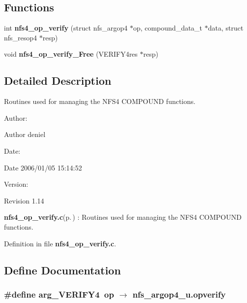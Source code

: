 \subsection*{Functions}
\begin{CompactItemize}
\item 
int {\bf nfs4\_\-op\_\-verify} (struct nfs\_\-argop4 $\ast$op, compound\_\-data\_\-t $\ast$data, struct nfs\_\-resop4 $\ast$resp)
\item 
void {\bf nfs4\_\-op\_\-verify\_\-Free} (VERIFY4res $\ast$resp)
\end{CompactItemize}


\subsection{Detailed Description}
Routines used for managing the NFS4 COMPOUND functions. 

\begin{Desc}
\item[Author:]\begin{Desc}
\item[Author]deniel \end{Desc}
\end{Desc}
\begin{Desc}
\item[Date:]\begin{Desc}
\item[Date]2006/01/05 15:14:52 \end{Desc}
\end{Desc}
\begin{Desc}
\item[Version:]\begin{Desc}
\item[Revision]1.14 \end{Desc}
\end{Desc}
{\bf nfs4\_\-op\_\-verify.c}{\rm (p.\,\pageref{nfs4__op__verify_8c})} : Routines used for managing the NFS4 COMPOUND functions.

Definition in file {\bf nfs4\_\-op\_\-verify.c}.

\subsection{Define Documentation}
\subsubsection{\setlength{\rightskip}{0pt plus 5cm}\#define arg\_\-VERIFY4\ op $\rightarrow$ nfs\_\-argop4\_\-u.opverify}\label{nfs4__op__verify_8c_a0}


